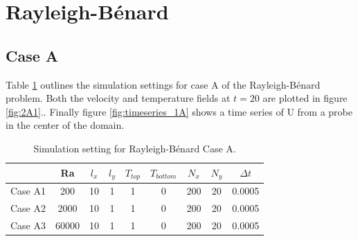 \documentclass[10pt,a4paper]{article}
\begin{document}
\newpage
\section{ Rayleigh-Bénard}

\subsection{Case A}

Table \ref{tbl:part2A} outlines the simulation settings for case A of the Rayleigh-Bénard problem. Both the velocity and temperature fields at $t = 20$ are plotted in figure \ref{fig:2A1}.. Finally figure \ref{fig:timeseries_1A} shows a time series of U from a probe in the center of the domain.

 
\begin{table}[H]
\centering
\begin{tabular}{c|cccccccc}
 & Ra & $l_x$ & $l_y$ & $T_{top}$ &$ T_{bottom}$ & $N_x$ & $N_y$ & $\Delta t$ \\ 
\hline 
Case A1 & 200& 10 & 1& 1 & 0  & 200 & 20 & 0.0005 \\ 

Case A2 & 2000 & 10 & 1& 1 & 0  & 200 & 20 & 0.0005 \\ 
 
Case A3 & 60000 & 10 & 1& 1 & 0  & 200 & 20 & 0.0005 \\ 

\end{tabular} 
\caption{Simulation setting for Rayleigh-Bénard Case A.}
\label{tbl:part2A}
\end{table}
\end{document}
